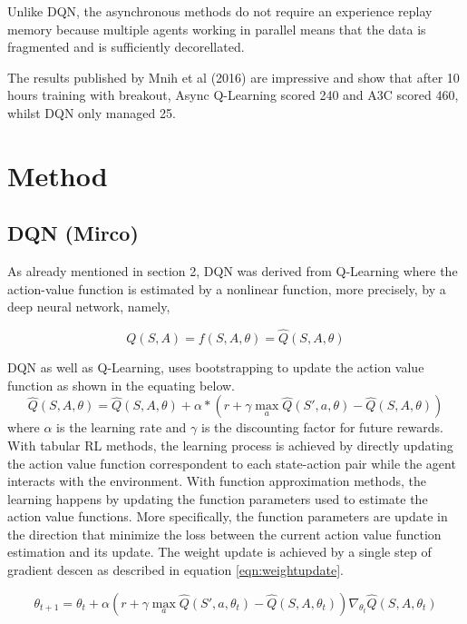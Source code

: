 \documentclass{article}
\begin{document}
Unlike DQN, the asynchronous methods do not require an experience replay memory because multiple agents working in parallel means that the data is fragmented and is sufficiently decorellated.

The results published by Mnih et al (2016) are impressive and show that after 10 hours training with breakout, Async Q-Learning scored 240 and A3C scored 460, whilst DQN only managed 25.


\section{Method}
\subsection{DQN (Mirco)}

As already mentioned in section 2, DQN was derived from Q-Learning where the action-value function is estimated by a nonlinear function, more precisely, by a deep neural network, namely,

\begin{equation}
Q(S,A) = f(S,A,\theta) = \hat{Q}(S,A,\theta)
\end{equation}

DQN as well as Q-Learning, uses bootstrapping to update the action value function as shown in the equating below. 
\begin{equation}
\hat{Q}(S,A,\theta) = \hat{Q}(S,A,\theta) + \alpha * \left( r + \gamma \max_{a} \hat{Q}(S',a,\theta) - \hat{Q}(S,A,\theta) \right)
\end{equation}
where $\alpha$ is the learning rate and $\gamma$ is the discounting factor for future rewards.
With tabular RL methods, the learning process is achieved by directly updating the action value function correspondent to each state-action pair while the agent interacts with the environment. With function approximation methods, the learning happens by updating the function parameters used to estimate the action value functions.
More specifically, the function parameters are update in the direction that minimize the loss between the current action value function estimation and its update. The weight update is achieved by a single step of gradient descen as described in equation \ref{eqn:weightupdate}.

\begin{equation}
\label{eqn:weightupdate}
\theta_{t+1} = \theta_{t} + \alpha \left( r + \gamma \max_{a} \hat{Q}(S',a,\theta_{t}) - \hat{Q}(S,A,\theta_{t}) \right) \nabla_{\theta_{t}} \hat{Q}(S,A,\theta_{t})
\end{equation}
\end{document}
